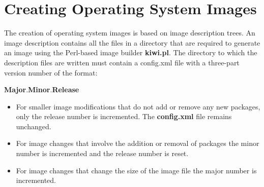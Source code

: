 \chapter{Creating Operating System Images}
\label{chapter:cropsysimg}
\minitoc

The creation of operating system images is based on image description
trees. An image description contains all the files in a directory that
are required to generate an image using the Perl-based image builder
\textbf{kiwi.pl}. The directory to which the description files are
written must contain a config.xml file with a three-part version number of
the format:

\begin{Command}{9cm}
\textbf{Major}.\textbf{Minor}.\textbf{Release}
\end{Command}

\begin{itemize}
\item For smaller image modifications that do not add or remove any
      new packages, only the release number is incremented.
      The \textbf{config.xml} file remains unchanged.
\item For image changes that involve the addition or removal of packages
      the minor number is incremented and the release number is reset.
\item For image changes that change the size of the image file
      the major number is incremented.
\end{itemize}

